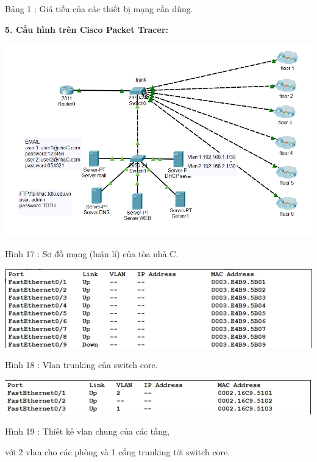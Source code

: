 \documentclass{report}
\begin{document}
\smallskip
\centerline{Bảng 1 : Giá tiền của các thiết bị mạng cần dùng.}

\bigskip
\changefontsizes{14pt}
\textbf{5.	Cấu hình trên Cisco Packet Tracer:}
\changefontsizes{13pt}
\bigskip

\begin{center}
     \includegraphics[scale=0.95]{cisco}
\end{center}
\centerline{Hình 17 : Sơ đồ mạng (luận lí) của tòa nhà C.}
\bigskip

\begin{center}
     \includegraphics[scale=0.8]{im1}
\end{center}
\centerline{Hình 18 : Vlan trunking của switch core.}
\bigskip

\begin{center}
     \includegraphics[scale=0.8]{im2}
\end{center}
\centerline{Hình 19 : Thiết kế vlan chung của các tầng, }
\centerline{với 2 vlan cho các phòng và 1 cổng trunking tới switch core.}
\bigskip
\end{document}
